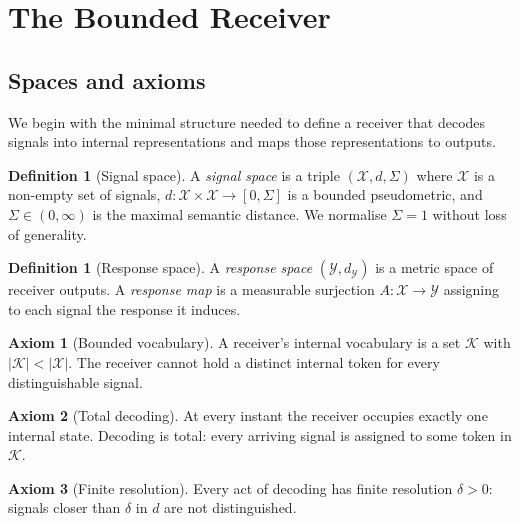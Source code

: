 \documentclass[twocolumn,11pt,a4paper]{article}
\theoremstyle{main}
\theoremstyle{definition}
\newtheorem{definition}[theorem]{Definition}
\newtheorem{axiom}{Axiom}
\theoremstyle{remark}
\newcommand{\Out}{\mathcal{X}}
\newcommand{\Know}{\mathcal{K}}
\newcommand{\Acts}{\mathcal{Y}}
\newcommand{\dist}{d}
\newcommand{\Sig}{\Sigma}
\begin{document}
\section{The Bounded Receiver}
\label{sec:receiver}

\subsection{Spaces and axioms}

We begin with the minimal structure needed to define a receiver that
decodes signals into internal representations and maps those
representations to outputs.

\begin{definition}[Signal space]
\label{def:signal}
A \emph{signal space} is a triple $(\Out, \dist, \Sig)$ where $\Out$ is
a non-empty set of signals, $\dist : \Out \times \Out \to [0, \Sig]$ is
a bounded pseudometric, and $\Sig \in (0,\infty)$ is the maximal
semantic distance. We normalise $\Sig = 1$ without loss of generality.
\end{definition}

\begin{definition}[Response space]
\label{def:response}
A \emph{response space} $(\Acts, \dist_\Acts)$ is a metric space of
receiver outputs. A \emph{response map} is a measurable surjection
$A : \Out \to \Acts$ assigning to each signal the response it induces.
\end{definition}

\begin{axiom}[Bounded vocabulary]
\label{ax:bounded}
A receiver's internal vocabulary is a set $\Know$ with $|\Know| <
|\Out|$. The receiver cannot hold a distinct internal token for every
distinguishable signal.
\end{axiom}

\begin{axiom}[Total decoding]
\label{ax:total}
At every instant the receiver occupies exactly one internal state.
Decoding is total: every arriving signal is assigned to some token in
$\Know$.
\end{axiom}

\begin{axiom}[Finite resolution]
\label{ax:resolution}
Every act of decoding has finite resolution $\delta > 0$: signals
closer than $\delta$ in $\dist$ are not distinguished.
\end{axiom}
\end{document}
